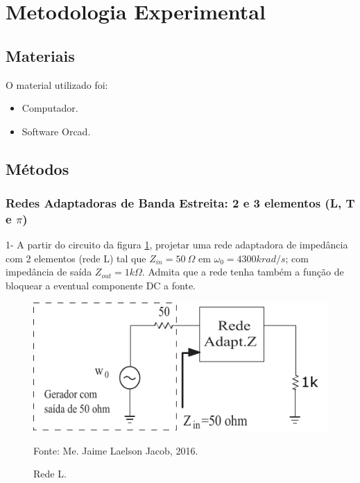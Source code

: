 \newpage
\section{Metodologia Experimental}

\subsection{Materiais}
O material utilizado foi:
\begin{itemize}
\item Computador.
\item Software Orcad.
\end{itemize}

\subsection{Métodos}

\subsubsection{Redes Adaptadoras de Banda Estreita: 2 e 3 elementos (L, T e $\pi$)}

1- A partir do circuito da figura \ref{fig:redeL}, projetar uma rede adaptadora de impedância com 2 elementos (rede L) tal que $Z_{in} = 50 \ \Omega$ em $\omega_0 = 4300 krad/s$; com impedância de saída $Z_{out} = 1k\Omega$. Admita que a rede tenha também a função de bloquear a eventual componente DC a fonte.

\begin{figure}[H]
    \centering
    \caption{Rede L.}
    \includegraphics[scale=1]{Imagens/redeL.pdf}
    \label{fig:redeL}
    
    \small Fonte: Me. Jaime Laelson Jacob, 2016.
\end{figure}

